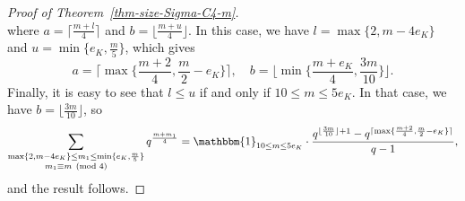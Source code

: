 \documentclass[11pt]{amsart}
\theoremstyle{theorem}
\theoremstyle{example}
\theoremstyle{definition}
\numberwithin{theorem}{section}
\numberwithin{theorem}{section}
\begin{document}
\begin{proof}[Proof of Theorem~\ref{thm-size-Sigma-C4-m}]
$$    $$
    where $a = \lceil \frac{m+l}{4}\rceil$ and $b = \lfloor \frac{m+u}{4}\rfloor$. In this case, we have $l = \max\{2, m - 4e_K\}$ and $u = \min\{e_K, \frac{m}{5}\}$, which gives 
    $$
    a = \lceil \max\{
        \frac{m+2}{4}
        ,
        \frac{m}{2} - e_K
    \}\rceil,\quad b = \lfloor \min\{
        \frac{m+e_K}{4}
        ,
        \frac{3m}{10}
    \}\rfloor.
    $$
    Finally, it is easy to see that $l \leq u$ if and only if $10 \leq m \leq 5e_K$. In that case, we have $b = \lfloor \frac{3m}{10}\rfloor$, so 
    $$
    \sum_{\substack{\max\{2, m - 4e_K\} \leq m_1 \leq \min\{e_K, \frac{m}{5}
     \} \\ m_1 \equiv m \pmod{4}}} q^{\frac{m + m_1}{4}} =  \mathbbm{1}_{10 \leq m \leq 5e_K} \cdot \frac{
        q^{\lfloor \frac{3m}{10}\rfloor + 1}
        - 
        q^{\lceil \max\{
            \frac{m+2}{4}
            ,
            \frac{m}{2} - e_K
        \}\rceil}
     }{q-1},
    $$
    and the result follows.
\end{proof}
\end{document}
